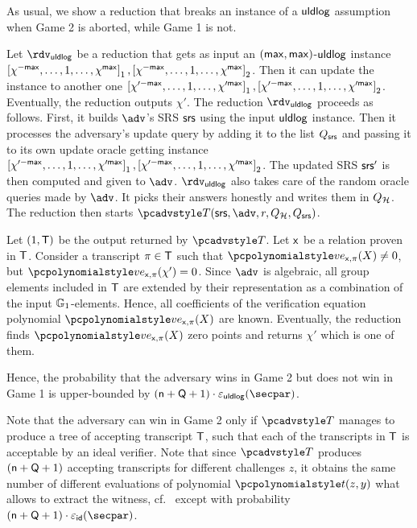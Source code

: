   As usual, we show a reduction that breaks an instance of a $\mathsf{uldlog}$ assumption when Game 2 is aborted, while Game 1 is not.

  Let $\rdvuldlog$ be a reduction that gets as input an $(\mathsf{max}, \mathsf{max})$-$\mathsf{uldlog}$ instance $\left[\chi^{-\mathsf{max}}, \ldots, 1, \ldots, \chi^{\mathsf{max}}\right]_{1}, \left[\chi^{-\mathsf{max}}, \ldots, 1, \ldots, \chi^{\mathsf{max}}\right]_{2}$. Then it can update the instance to another one $\left[\chi'^{-\mathsf{max}}, \ldots, 1, \ldots, \chi'^{\mathsf{max}}\right]_{1}, \left[\chi'^{-\mathsf{max}}, \ldots, 1, \ldots, \chi'^{\mathsf{max}}\right]_{2}$. Eventually, the reduction outputs $\chi'$.
	The reduction $\rdvuldlog$ proceeds as follows.
	First, it builds $\adv$'s SRS $\mathsf{srs}$ using the input $\mathsf{uldlog}$ instance. Then it processes the adversary's update query by adding it to the list $Q_{\mathsf{srs}}$ and passing it to its own update oracle getting instance $\left[\chi'^{-\mathsf{max}}, \ldots, 1, \ldots, \chi'^{\mathsf{max}}\right]_{1}, \left[\chi'^{-\mathsf{max}}, \ldots, 1, \ldots, \chi'^{\mathsf{max}}\right]_{2}$. The updated SRS $\mathsf{srs}'$ is then computed and given to $\adv$. $\rdvuldlog$ also takes care of the random oracle queries made by $\adv$. It picks their answers honestly and writes them in $Q_{\mathcal{H}}$. The reduction then starts $\tdv(\srs, \adv, r, \Qro, \Qsrs)$.
	
  Let $(1, \mathsf{T})$ be the output returned by $\tdv$. Let $\mathsf{x}$ be a relation proven in $\mathsf{T}$.  Consider a transcript $\pi \in \mathsf{T}$ such that $\vereq_{\inp, \zkproof}(X) \neq 0$, but $\vereq_{\inp, \zkproof}(\chi') = 0$. Since $\adv$ is algebraic, all group elements included in $\mathsf{T}$ are extended by their representation as a combination of the input $\mathbb{G}_1$-elements. Hence, all coefficients of the verification equation polynomial $\vereq_{\inp, \zkproof}(X)$ are known. 
  Eventually, the reduction finds $\vereq_{\inp, \zkproof}(X)$ zero points and returns $\chi'$ which is one of them.
    
  Hence, the probability that the adversary wins in Game 2 but does not win in Game 1 is upper-bounded by $(\multconstr + \linconstr + 1) \cdot \epsuldlog (\secpar)$.

  Note that the adversary can win in Game 2 only if $\tdv$ manages to produce a tree of accepting transcript $\mathsf{T}$, such that each of the transcripts in $\mathsf{T}$ is acceptable by an ideal verifier. Note that since $\tdv$ produces $(\mathsf{n} + \mathsf{Q} + 1)$ accepting transcripts for different challenges $z$, it obtains the same number of different evaluations of polynomial $\p{t} (z, y)$ what allows to extract the witness, cf.~\cite{CCS:MBKM19} except with probability $(\multconstr + \linconstr + 1) \cdot \epsid(\secpar)$.


